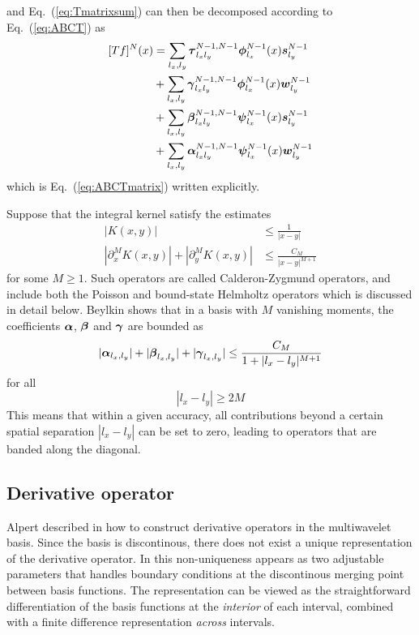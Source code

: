 and Eq.~(\ref{eq:Tmatrixsum}) can then be decomposed according to Eq.~(\ref{eq:ABCT}) as
\begin{align}
	\label{eq:ABCTmatrixsum}
	\begin{split}
	[Tf]^N(x) &= \sum_{l_x,l_y}\boldsymbol \tau^{N-1,N-1}_{l_xl_y}
	\boldsymbol{\phi}^{N-1}_{l_x}(x) \boldsymbol {s}^{N-1}_{l_y}\\
	&+ \sum_{l_x,l_y}\boldsymbol \gamma^{N-1,N-1}_{l_xl_y}
	\boldsymbol{\phi}^{N-1}_{l_x}(x) \boldsymbol {w}^{N-1}_{l_y}\\
	&+ \sum_{l_x,l_y}\boldsymbol \beta^{N-1,N-1}_{l_xl_y}
	\boldsymbol{\psi}^{N-1}_{l_x}(x) \boldsymbol {s}^{N-1}_{l_y}\\
	&+ \sum_{l_x,l_y}\boldsymbol \alpha^{N-1,N-1}_{l_xl_y}
	\boldsymbol{\psi}^{N-1}_{l_x}(x) \boldsymbol {w}^{N-1}_{l_y}
	\end{split}
\end{align}
which is Eq.~(\ref{eq:ABCTmatrix}) written explicitly. 

Suppose that the integral kernel satisfy the estimates
\begin{align}
    |K(x,y)| &\leq \frac{1}{|x-y|}\\
    |\partial_x^M K(x,y)|+ |\partial_y^M K(x,y)| &\leq \frac{C_M}{|x-y|^{M+1}}
\end{align}
for some $M\geq1$. Such operators are called Calderon-Zygmund operators, and
include both the Poisson and bound-state Helmholtz operators which is discussed 
in detail below. Beylkin \etal\cite{Beylkin} shows that in a basis with
$M$ vanishing moments, the coefficients $\boldsymbol \alpha$, $\boldsymbol \beta$ and 
$\boldsymbol \gamma$ are bounded as
\begin{equation}
    |\boldsymbol \alpha_{l_x,l_y}| + |\boldsymbol \beta_{l_x,l_y}| + |\boldsymbol \gamma_{l_x,l_y}| 
	\leq \frac{C_M}{1+|l_x-l_y|^{M+1}}
\end{equation}
for all
\begin{equation}
    |l_x-l_y| \geq 2M
\end{equation}
This means that within a given accuracy, all contributions beyond a certain spatial 
separation $|l_x-l_y|$ can be set to zero, leading to operators that are banded 
along the diagonal.

\subsection{Derivative operator}\label{sec:diff_oper}
Alpert \etal described in \cite{Alpert} how to construct derivative operators in
the multiwavelet basis. Since the basis is discontinous, there does not exist a
unique representation of the derivative operator. In \cite{Alpert} this non-uniqueness
appears as two adjustable parameters that handles boundary conditions at the
discontinous merging point between basis functions. The representation can be
viewed as the straightforward differentiation of the basis functions at the 
\emph{interior} of each interval, combined with a finite difference representation
\emph{across} intervals.

